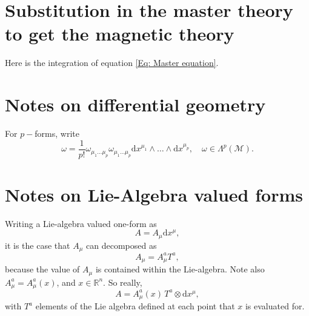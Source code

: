 \documentclass{article}
\begin{document}
\section{Substitution in the master theory to get the magnetic theory}
\label{appendixelectricsubstitution}
Here is the integration of equation \eqref{Eq: Master equation}. 


\section{Notes on differential geometry}
For $p-$forms, write
\begin{equation}
    \omega = \frac{1}{p!}\omega_{\mu_{1}\ldots\mu_{p}}\omega_{\mu_{1}\ldots\mu_{p}}\mathrm{d}x^{\mu_{1}}\wedge \ldots\wedge\mathrm{d}x^{\mu_{p}},\quad \omega\in \Lambda^{p}\left(\mathcal{M}\right).
\end{equation}

\section{Notes on Lie-Algebra valued forms}
Writing a Lie-algebra valued one-form as 
\begin{equation}
    A = A_{\mu}\mathrm{d}x^{\mu},
\end{equation}
it is the case that $A_{\mu}$ can decomposed as 
\begin{equation}
    A_{\mu} = A_{\mu}^{a}T^{a},
\end{equation}
because the value of $A_{\mu}$ is contained within the Lie-algebra. Note also $A_{\mu}^{a} = A_{\mu}^{a}(x)$, and $x\in \mathbb{R}^{n}$. So really,
\begin{equation}
    A = A_{\mu}^{a}(x)\, T^{a}\otimes \mathrm{d}x^{\mu},
\end{equation}
with $T^{a}$ elements of the Lie algebra defined at each point that $x$ is evaluated for. \newline
\end{document}
